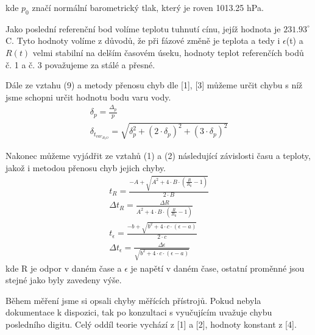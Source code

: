 \documentclass{article}
\begin{document}
kde $p_{0}$ značí normální barometrický tlak, který je roven 1013.25 hPa.
\par Jako poslední referenční bod volíme teplotu tuhnutí cínu, jejíž hodnota je $231.93^{\circ}$ C. Tyto hodnoty volíme z důvodů, že při fázové změně je teplota a tedy i $\epsilon$(t) a $R(t)$ velmi stabilní na delším časovém úseku, hodnoty teplot referenčích bodů č. 1 a č. 3 považujeme za stálé a přesné. 
\par Dále ze vztahu (9) a metody přenosu chyb dle [1], [3] můžeme určit chybu s níž jsme schopni určit hodnotu bodu varu vody.
\begin{align}
\delta_{p} = \frac{\Delta_{p}}{p} \\
\delta_{t_{var_{H_{2}O}}} = \sqrt{\delta_{p}^{2}+(2\cdot \delta_{p})^{2}+(3\cdot \delta_{p})^{2}}
\end{align}
\par Nakonec můžeme vyjádřit ze vztahů (1) a (2) následující závislosti času a teploty, jakož i metodou přenosu chyb jejich chyby.
\begin{align}
t_{R} = \frac{-A+\sqrt{A^2+4\cdot B\cdot(\frac{R}{R_{0}}-1)}}{2\cdot B} \\
\Delta{t_{R}} = \frac{\Delta{R}}{A^{2}+4\cdot B\cdot(\frac{R}{R_{0}}-1)}\\
t_{\epsilon} = \frac{-b+\sqrt{b^2+4\cdot c\cdot(\epsilon-a)}}{2\cdot c}\\
\Delta{t_{\epsilon}} = \frac{\Delta{\epsilon}}{\sqrt{b^{2}+4\cdot c\cdot(\epsilon-a)}}
\end{align}
kde R je odpor v daném čase a $\epsilon$ je napětí v daném čase, ostatní proměnné jsou stejné jako byly zavedeny výše.
\par Během měření jsme si opsali chyby měřících přístrojů. Pokud nebyla dokumentace k dispozici, tak po konzultaci s vyučujícím uvažuje chybu posledního digitu. Celý oddíl teorie vychází z [1] a [2], hodnoty konstant z [4].
\end{document}

